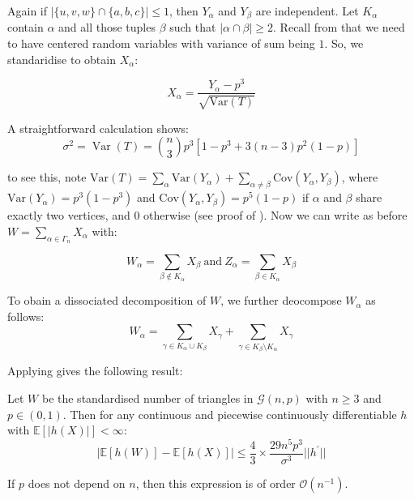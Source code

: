 \documentclass{article}
\begin{document}
Again if $|\{u,v,w\}\cap \{a,b,c\}|\leq 1$, then $Y_\alpha$ and $Y_\beta$ are independent. Let $K_\alpha$ contain $\alpha$ and all those tuples $\beta$ such that $|\alpha\cap \beta|\geq 2$. Recall from  that we need to have centered random variables with variance of sum being $1$. So, we standaridise to obtain $X_\alpha$:

\[
    X_{\alpha}=\frac{Y_{\alpha}-p^{3}}{\sqrt{\mathrm{Var}(T)}}
\]

A straightforward calculation shows:
\[
    \sigma^{2}=\operatorname{Var}(T)={\binom{n}{3}}p^{3}[1-p^{3}+3(n-3)p^{2}(1-p)]
\]

to see this, note $\mathrm{Var}(T) = \sum_\alpha \mathrm{Var}(Y_\alpha) + \sum_{\alpha\neq \beta} \mathrm{Cov}(Y_\alpha, Y_\beta)$, where $\mathrm{Var}(Y_\alpha) = p^3(1-p^3)$ and $\mathrm{Cov}(Y_\alpha, Y_\beta) = p^5(1-p)$ if $\alpha$ and $\beta$ share exactly two vertices, and 0 otherwise (see proof of ). Now we can write as before $W = \sum_{\alpha \in \Gamma_n} X_\alpha$ with:

\[
    W_{\alpha}=\sum_{\beta\notin K_{\alpha}}X_{\beta}{\mathrm{~and~}}Z_{\alpha}=\sum_{\beta\in K_{\alpha}}X_{\beta}
\]

To obain a dissociated decomposition of $W$, we further deocompose $W_\alpha$ as follows:
\[
    W_{\alpha}=\sum_{\gamma\in K_{\alpha}\cup K_{\beta}}X_{\gamma}+\sum_{\gamma\in K_{\beta}\setminus K_{\alpha}}X_{\gamma}
\]

Applying  gives the following result:

\begin{theorem}\label{thm:triangle_gnp_normal}
    Let $W$ be the standardised number of triangles in $\mathcal{G}(n,p)$ with $n\geq 3$ and $p\in (0,1)$. Then for any continuous and piecewise continuously differentiable $h$ with $\mathbb{E}[|h(X)|]<\infty$: 
    \[
        |\mathbb{E} [h(W)]- \mathbb{E}[h(X)]| \leq \frac{4}{3}\times\frac{29n^{5}p^{3}}{\sigma^{3}}||h^{\prime}||
    \]

    If $p$ does not depend on $n$, then this expression is of order $\mathcal{O}(n^{-1})$.
\end{theorem}
\end{document}
